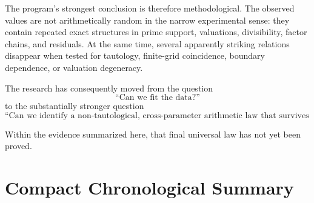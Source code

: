 \documentclass[11pt,a4paper]{article}
\begin{document}
The program's strongest conclusion is therefore methodological. The observed values are not arithmetically random in the narrow experimental sense: they contain repeated exact structures in prime support, valuations, divisibility, factor chains, and residuals. At the same time, several apparently striking relations disappear when tested for tautology, finite-grid coincidence, boundary dependence, or valuation degeneracy.

The research has consequently moved from the question
\[
\text{``Can we fit the data?''}
\]
to the substantially stronger question
\[
\text{``Can we identify a non-tautological, cross-parameter arithmetic law that survives independent replication?''}
\]

Within the evidence summarized here, that final universal law has not yet been proved.

\appendix

\section{Compact Chronological Summary}
\end{document}
